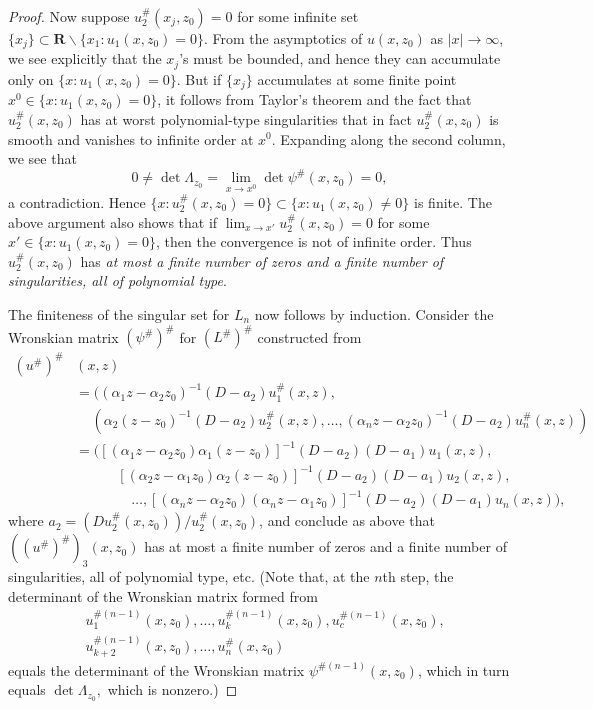 \documentclass{surv-l}
\theoremstyle{plain}
\theoremstyle{definition}
\numberwithin{equation}{chapter}
\begin{document}
\begin{proof}
Now suppose $u_{2}^{\#}(x_{j}, z_{0})=0$ for some infinite set $\{x_{j}\}\subset \textbf{R}\backslash \{x_{1}:u_{1}(x, z_{0})= 0\}$. From the asymptotics of $u(x, z_{0})$ as $|x|\rightarrow\infty$, we see explicitly that the $x_{j}$'s must be bounded, and hence they can accumulate only on $\{x:u_{1}(x, z_{0})=0\}$. But if $\{x_{j}\}$ accumulates at some finite point $x^{0}\in\{x:u_{1}(x, z_{0})=0\}$, it follows from Taylor's theorem and the fact that $u_{2}^{\#}(x, z_{0})$ has at worst polynomial-type singularities that in fact $u_{2}^{\#}(x, z_{0})$ is smooth and vanishes to infinite order at $x^{0}$. Expanding along the second column, we see that
\begin{equation*}
0\neq\det\Lambda_{z_{0}}=\lim_{x\rightarrow x^{0}}\det\psi^{\#}(x, z_{0})=0,
\end{equation*}
a contradiction. Hence $\{x:u_{2}^{\#}(x, z_{0})=0\}\subset\{x:u_{1}(x, z_{0})\neq 0\}$ is finite. The above argument also shows that if $\lim_{x\rightarrow x'}u_{2}^{\#}(x, z_{0})=0$ for some $x'\in\{x : u_{1}(x, z_{0})=0\}$, then the convergence is not of infinite order. Thus $u_{2}^{\#}(x, z_{0})$ has \emph{at most a finite number of zeros and a finite number of singularities, all of polynomial type}.

The finiteness of the singular set for $L_{n}$ now follows by induction. Consider the Wronskian matrix $(\psi^{\#})^{\#}$ for $(L^{\#})^{\#}$ constructed from
\begin{align*}
(u^{\#})^{\#}&(x, z)\\
& =((\alpha_{1}z-\alpha_{2}z_{0})^{-1}(D-a_{2})u_{1}^{\#}(x, z),\\
&\quad\,(\alpha_{2}(z-z_{0})^{-1}(D-a_{2})u_{2}^{\#}(x, z),\ldots,(\alpha_{n}z-\alpha_{2}z_{0})^{-1}(D-a_{2})u_{n}^{\#}(x, z))\\
& =([(\alpha_{1}z-\alpha_{2}z_{0})\alpha_{1}(z-z_{0})]^{-1}(D-a_{2})(D-a_{1})u_{1}(x, z),\\
& \quad \qquad [(\alpha_{2}z-\alpha_{1}z_{0})\alpha_{2}(z-z_{0})]^{-1}(D-a_{2})(D-a_{1})u_{2}(x, z),\\
& \qquad \qquad \ldots,[(\alpha_{n}z-\alpha_{2}z_{0})(\alpha_{n}z-\alpha_{1}z_{0})]^{-1}(D-a_{2})(D-a_{1})u_{n}(x, z)),
\end{align*}
where $a_{2}=(Du_{2}^{\#}(x, z_{0}))/u_{2}^{\#}(x, z_{0})$, and conclude as above that $((u^{\#})^{\#})_{3}(x, z_{0})$ has at most a finite number of zeros and a finite number of singularities, all of polynomial type, etc. (Note that, at the $n$th step, the determinant of the Wronskian matrix formed from
\begin{align*}
&u_{1}^{\#(n-1)}(x,z_{0}),\ldots, u_{k}^{\#(n-1)}(x, z_{0}),u_{c}^{\#(n-1)}(x, z_{0}), \\
&u_{k+2}^{\#(n-1)}(x, z_{0}),\ldots,u_{n}^{\#}(x, z_{0})
\end{align*}
equals the determinant of the Wronskian matrix $\psi^{\#(n-1)}(x, z_{0})$, which in turn equals $\det\Lambda_{z_{0}},$ which is nonzero.)


\end{proof}
\end{document}
